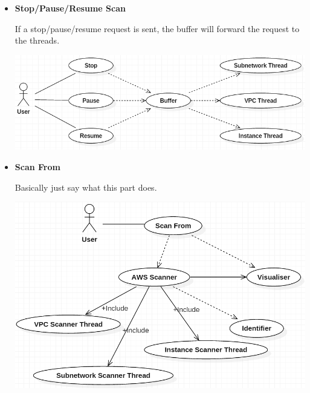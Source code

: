 \documentclass[a4paper,12pt]{report}
\begin{document}
\begin{itemize}
	\item \textbf{Stop/Pause/Resume Scan}
	\begin{flushleft}
	If a stop/pause/resume request is sent, the buffer will forward the request to the threads.
	\end{flushleft}
	\begin{center}
		\includegraphics[width=1\textwidth] {./Diagrams/StopResumePauseUseCase.png}\\[0.4cm]    
	\end{center}

	\item \textbf{Scan From}
	\begin{flushleft}
		Basically just say what this part does.
	\end{flushleft}
	\begin{center}
		\includegraphics[width=1\textwidth] {./Diagrams/ScanFromUseCase.png}\\[0.4cm]    
	\end{center}


\end{itemize}
\end{document}
